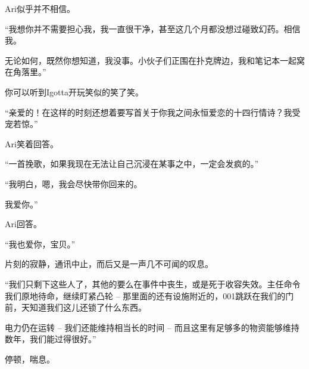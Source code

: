 \begin{scpbox}
Ari似乎并不相信。
\end{scpbox}

\begin{scpdialog}
“我想你并不需要担心我，我一直很干净，甚至这几个月都没想过碰致幻药。相信我。

无论如何，既然你想知道，我没事。小伙子们正围在扑克牌边，我和笔记本一起窝在角落里。”
\end{scpdialog}

\begin{scpbox}
你可以听到Igotta开玩笑似的笑了笑。
\end{scpbox}

\begin{scpdialog}
“亲爱的！在这样的时刻还想着要写首关于你我之间永恒爱恋的十四行情诗？我受宠若惊。”
\end{scpdialog}

\begin{scpbox}
Ari笑着回答。
\end{scpbox}

\begin{scpdialog}
“一首挽歌，如果我现在无法让自己沉浸在某事之中，一定会发疯的。”
\end{scpdialog}

\begin{scpdialog}
“我明白，嗯，我会尽快带你回来的。

我爱你。”
\end{scpdialog}

\begin{scpbox}
Ari回答。
\end{scpbox}

\begin{scpdialog}
“我也爱你，宝贝。”
\end{scpdialog}

\begin{scpbox}
片刻的寂静，通讯中止，而后又是一声几不可闻的叹息。
\end{scpbox}

\begin{scpdialog}
“我们只剩下这些人了，其他的要么在事件中丧生，或是死于收容失效。主任命令我们原地待命，继续盯紧凸轮 – 那里面的还有设施附近的，001跳跃在我们的门前，天知道我们这儿还锁了什么东西。

电力仍在运转 – 我们还能维持相当长的时间 – 而且这里有足够多的物资能够维持数年，我们能过得很好。”
\end{scpdialog}

\begin{scpbox}
停顿，喘息。
\end{scpbox}

